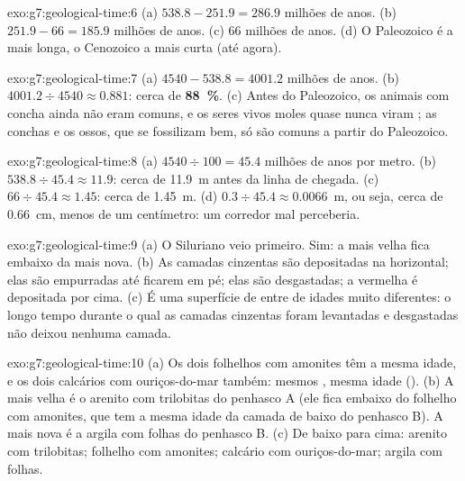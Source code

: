 \begin{solution}{exo:g7:geological-time:6}
(a) $538.8 - 251.9 = 286.9$ milhões de anos. (b) $251.9 - 66 = 185.9$
milhões de anos. (c) 66 milhões de anos. (d) O Paleozoico é a mais longa,
o Cenozoico a mais curta (até agora).
\end{solution}

\begin{solution}{exo:g7:geological-time:7}
(a) $4540 - 538.8 = 4001.2$ milhões de anos. (b) $4001.2 \div 4540
\approx 0.881$: cerca de \textbf{88~\%}. (c) Antes do Paleozoico, os
animais com concha ainda não eram comuns, e os seres vivos moles quase
nunca viram ; as conchas e os ossos, que se fossilizam bem, só são
comuns a partir do Paleozoico.
\end{solution}

\begin{solution}{exo:g7:geological-time:8}
(a) $4540 \div 100 = 45.4$ milhões de anos por metro. (b) $538.8 \div 45.4
\approx 11.9$: cerca de \qty{11.9}{m} antes da linha de chegada. (c) $66 \div
45.4 \approx 1.45$: cerca de \qty{1.45}{m}. (d) $0.3 \div 45.4 \approx
0.0066$~m, ou seja, cerca de \qty{0.66}{cm}, menos de um centímetro: um
corredor mal perceberia.
\end{solution}

\begin{solution}{exo:g7:geological-time:9}
(a) O Siluriano veio primeiro. Sim: a  mais velha fica embaixo da
mais nova. (b) As camadas cinzentas são depositadas na horizontal; elas
são empurradas até ficarem em pé; elas são desgastadas; a  vermelha
é depositada por cima. (c) É uma superfície de  entre  de
idades muito diferentes: o longo tempo durante o qual as camadas
cinzentas foram levantadas e desgastadas não deixou nenhuma camada.
\end{solution}

\begin{solution}{exo:g7:geological-time:10}
(a) Os dois folhelhos com amonites têm a mesma idade, e os dois calcários
com ouriços-do-mar também: mesmos , mesma idade (). (b) A mais velha é o arenito com trilobitas do
penhasco A (ele fica embaixo do folhelho com amonites, que tem a mesma
idade da camada de baixo do penhasco B). A mais nova é a argila com
folhas do penhasco B. (c) De baixo para cima: arenito com trilobitas;
folhelho com amonites; calcário com ouriços-do-mar; argila com folhas.
\end{solution}

